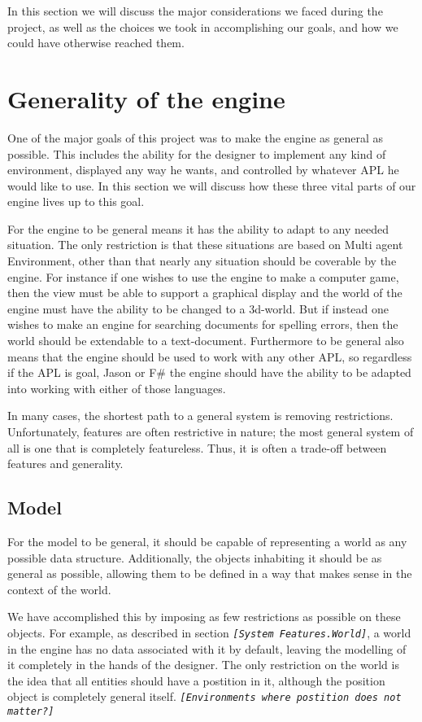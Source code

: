 In this section we will discuss the major considerations we faced
during the project, as well as the choices we took in accomplishing
our goals, and how we could have otherwise reached them.


\section{Generality of the engine}

One of the major goals of this project was to make the engine as general
as possible. This includes the ability for the designer to implement
any kind of environment, displayed any way he wants, and controlled
by whatever APL he would like to use. In this section we will discuss
how these three vital parts of our engine lives up to this goal.

For the engine to be general means it has the ability to adapt to
any needed situation. The only restriction is that these situations
are based on Multi agent Environment, other than that nearly any situation
should be coverable by the engine. For instance if one wishes to use
the engine to make a computer game, then the view must be able to
support a graphical display and the world of the engine must have
the ability to be changed to a 3d-world. But if instead one wishes
to make an engine for searching documents for spelling errors, then
the world should be extendable to a text-document. Furthermore to
be general also means that the engine should be used to work with
any other APL, so regardless if the APL is goal, Jason or F\# the
engine should have the ability to be adapted into working with either
of those languages.

In many cases, the shortest path to a general system is removing restrictions.
Unfortunately, features are often restrictive in nature; the most
general system of all is one that is completely featureless. Thus,
it is often a trade-off between features and generality.


\subsection*{Model}

For the model to be general, it should be capable of representing
a world as any possible data structure. Additionally, the objects
inhabiting it should be as general as possible, allowing them to be
defined in a way that makes sense in the context of the world. 

We have accomplished this by imposing as few restrictions as possible
on these objects. For example, as described in section \texttt{\emph{{[}System
Features.World{]}}}, a world in the engine has no data associated
with it by default, leaving the modelling of it completely in the
hands of the designer. The only restriction on the world is the idea
that all entities should have a postition in it, although the position
object is completely general itself. \texttt{\emph{{[}Environments
where postition does not matter?{]}}}

